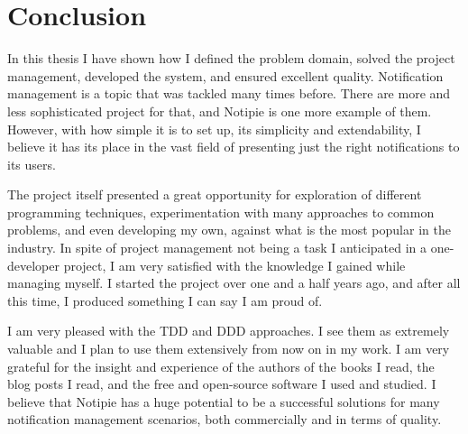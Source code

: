 \section{Conclusion}\label{sec:conclusion}

In this thesis I have shown
how I defined the problem domain,
solved the project management,
developed the system,
and ensured excellent quality.
Notification management is a topic
that was tackled many times before.
There are more and less sophisticated
project for that,
and Notipie is one more example of them.
However,
with how simple it is to set up,
its simplicity and extendability,
I believe it has its place
in the vast field of
presenting just the right notifications
to its users.

The project itself presented a great opportunity
for exploration of different programming techniques,
experimentation with many approaches to common problems,
and even developing my own,
against what is the most popular in the industry.
In spite of project management
not being a task I anticipated
in a one-developer project,
I am very satisfied with the knowledge
I gained while managing myself.
I started the project over one and a half years ago,
and after all this time, I produced something
I can say I am proud of.

I am very pleased with the \ac{TDD} and \ac{DDD} approaches.
I see them as extremely valuable
and I plan to use them extensively
from now on in my work.
I am very grateful for the insight
and experience of the authors of the books I read,
the blog posts I read,
and the free and open-source software
I used and studied.
I believe that Notipie has a huge potential
to be a successful solutions for many
notification management scenarios,
both commercially
and in terms of quality.
